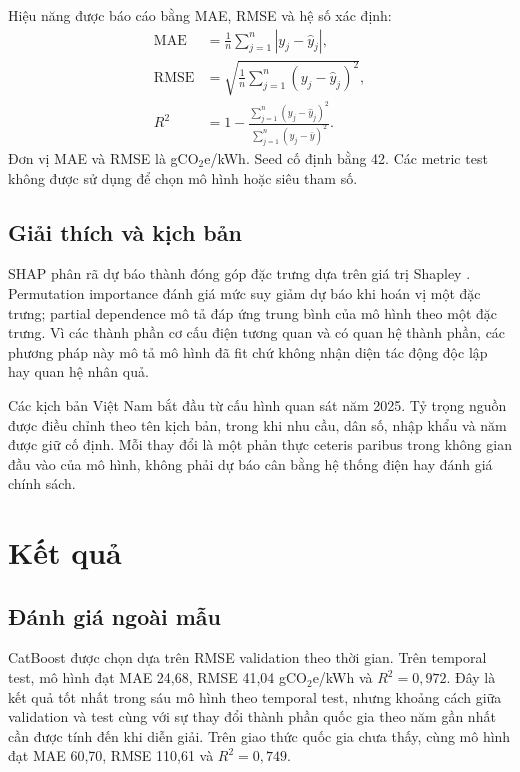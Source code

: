 \documentclass[11pt,a4paper]{article}
\begin{document}
Hiệu năng được báo cáo bằng MAE, RMSE và hệ số xác định:
\begin{align}
  \mathrm{MAE} &= \frac{1}{n}\sum_{j=1}^{n}|y_j-\hat y_j|,\\
  \mathrm{RMSE} &= \sqrt{\frac{1}{n}\sum_{j=1}^{n}(y_j-\hat y_j)^2},\\
  R^2 &= 1-\frac{\sum_{j=1}^{n}(y_j-\hat y_j)^2}
                  {\sum_{j=1}^{n}(y_j-\bar y)^2}.
\end{align}
Đơn vị MAE và RMSE là gCO$_2$e/kWh. Seed cố định bằng 42. Các metric test
không được sử dụng để chọn mô hình hoặc siêu tham số.

\subsection{Giải thích và kịch bản}

SHAP phân rã dự báo thành đóng góp đặc trưng dựa trên giá trị Shapley
\citep{lundberg2017}. Permutation importance đánh giá mức suy giảm dự báo khi
hoán vị một đặc trưng; partial dependence mô tả đáp ứng trung bình của mô hình
theo một đặc trưng. Vì các thành phần cơ cấu điện tương quan và có quan hệ
thành phần, các phương pháp này mô tả mô hình đã fit chứ không nhận diện tác
động độc lập hay quan hệ nhân quả.

Các kịch bản Việt Nam bắt đầu từ cấu hình quan sát năm 2025. Tỷ trọng nguồn
được điều chỉnh theo tên kịch bản, trong khi nhu cầu, dân số, nhập khẩu và năm
được giữ cố định. Mỗi thay đổi là một phản thực ceteris paribus trong không
gian đầu vào của mô hình, không phải dự báo cân bằng hệ thống điện hay đánh
giá chính sách.

\section{Kết quả}

\subsection{Đánh giá ngoài mẫu}

CatBoost được chọn dựa trên RMSE validation theo thời gian. Trên temporal
test, mô hình đạt MAE 24,68, RMSE 41,04 gCO$_2$e/kWh và $R^2=0,972$. Đây là
kết quả tốt nhất trong sáu mô hình theo temporal test, nhưng khoảng cách giữa
validation và test cùng với sự thay đổi thành phần quốc gia theo năm gần nhất
cần được tính đến khi diễn giải. Trên giao thức quốc gia chưa thấy, cùng mô
hình đạt MAE 60,70, RMSE 110,61 và $R^2=0,749$.
\end{document}
